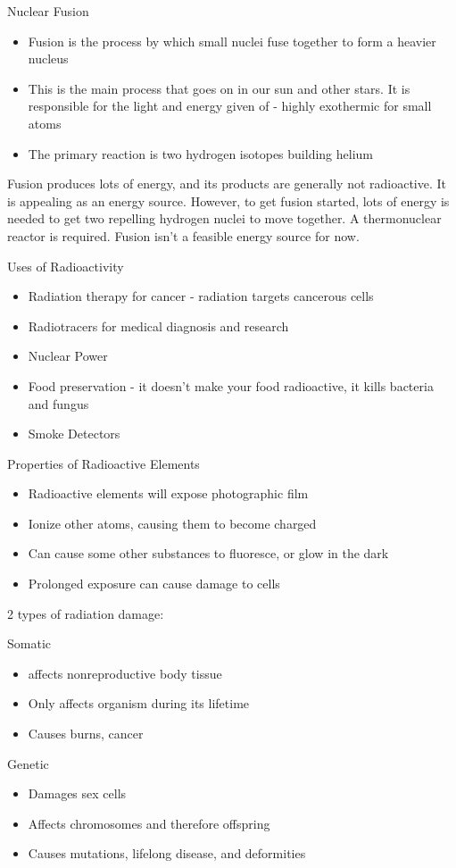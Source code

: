 \documentclass[../hchem.tex]{subfiles}
\begin{document}
Nuclear Fusion 
\begin{itemize}
    \item Fusion is the process by which small nuclei fuse together to form a heavier nucleus 
    \item This is the main process that goes on in our sun and other stars. It is responsible for the light and energy given of - highly exothermic for small atoms 
    \item The primary reaction is two hydrogen isotopes building helium 
\end{itemize}

Fusion produces lots of energy, and its products are generally not radioactive. It is appealing as an energy source. However, to get fusion started, lots of energy is needed to get two repelling hydrogen nuclei to move together.
A thermonuclear reactor is required. Fusion isn't a feasible energy source for now.

Uses of Radioactivity 
\begin{itemize}
    \item Radiation therapy for cancer - radiation targets cancerous cells 
    \item Radiotracers for medical diagnosis and research 
    \item Nuclear Power 
    \item Food preservation - it doesn't make your food radioactive, it kills bacteria and fungus 
    \item Smoke Detectors 
\end{itemize}

Properties of Radioactive Elements 
\begin{itemize}
    \item Radioactive elements will expose photographic film 
    \item Ionize other atoms, causing them to become charged 
    \item Can cause some other substances to fluoresce, or glow in the dark 
    \item Prolonged exposure can cause damage to cells 
\end{itemize}

2 types of radiation damage:

Somatic 
\begin{itemize}
    \item affects nonreproductive body tissue 
    \item Only affects organism during its lifetime 
    \item Causes burns, cancer 
\end{itemize}

Genetic 
\begin{itemize}
    \item Damages sex cells 
    \item Affects chromosomes and therefore offspring 
    \item Causes mutations, lifelong disease, and deformities 
\end{itemize}
\end{document}
